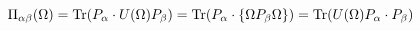 \begin{equation}                 
\Pi_{\alpha\beta}(\Omega)={\rm Tr}(P_\alpha\cdot U(\Omega)P_\beta)={\rm Tr}(P_\alpha\cdot
\{\Omega P_\beta\Omega\})={\rm Tr}(U(\Omega)P_\alpha\cdot P_\beta) \label{eq:yedi}   
\end{equation}


